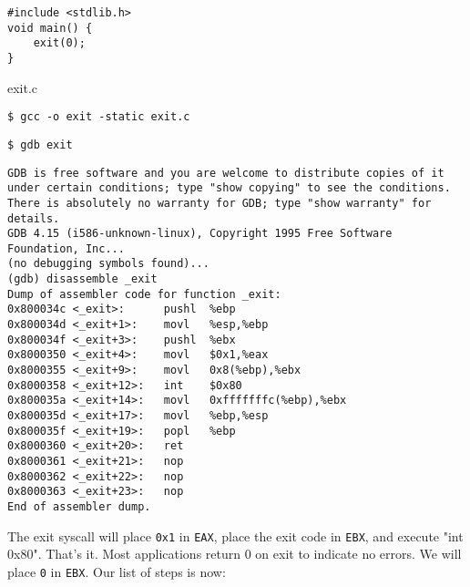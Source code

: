 \documentclass[a4paper]{article}
\begin{document}
\begin{listing}[ht]
\begin{verbatim}
#include <stdlib.h>
void main() {
    exit(0);
}
\end{verbatim}
\caption{exit.c}
\label{listing:1}
\end{listing}

\begin{lstlisting}[style=DOS]
$ gcc -o exit -static exit.c
\end{lstlisting}

\begin{lstlisting}[style=DOS]
$ gdb exit
\end{lstlisting}


\begin{verbatim}
GDB is free software and you are welcome to distribute copies of it under certain conditions; type "show copying" to see the conditions. There is absolutely no warranty for GDB; type "show warranty" for details. 
GDB 4.15 (i586-unknown-linux), Copyright 1995 Free Software Foundation, Inc...
(no debugging symbols found)...
(gdb) disassemble _exit
Dump of assembler code for function _exit:
0x800034c <_exit>:      pushl  %ebp
0x800034d <_exit+1>:    movl   %esp,%ebp
0x800034f <_exit+3>:    pushl  %ebx
0x8000350 <_exit+4>:    movl   $0x1,%eax
0x8000355 <_exit+9>:    movl   0x8(%ebp),%ebx
0x8000358 <_exit+12>:   int    $0x80
0x800035a <_exit+14>:   movl   0xfffffffc(%ebp),%ebx
0x800035d <_exit+17>:   movl   %ebp,%esp
0x800035f <_exit+19>:   popl   %ebp
0x8000360 <_exit+20>:   ret
0x8000361 <_exit+21>:   nop
0x8000362 <_exit+22>:   nop
0x8000363 <_exit+23>:   nop
End of assembler dump.
\end{verbatim}

The exit syscall will place \texttt{0x1} in \texttt{EAX}, place the exit code in \texttt{EBX}, and execute "int 0x80". That’s it. Most applications return 0 on exit to indicate no errors. We will place \texttt{0} in \texttt{EBX}. Our list of steps is now:
\end{document}
